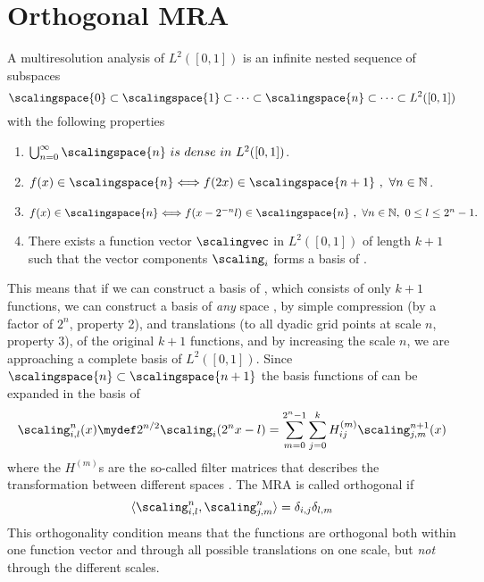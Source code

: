 \section{Orthogonal MRA}
A multiresolution analysis of $L^2([0,1])$ is an infinite nested sequence of subspaces
\begin{equation}
    \label{eq:MRA}
    \scalingspace{0}\subset \scalingspace{1}\subset \cdots \subset 
	\scalingspace{n}\subset \cdots \subset L^2([0,1])
\end{equation}
with the following properties
\begin{enumerate}
    \item $\bigcup_{n=0}^{\infty}\scalingspace{n}\ is\ dense\ in\ L^2([0,1])$.
    \item $f(x) \in \scalingspace{n} \Longleftrightarrow f(2x) \in \scalingspace{n+1}
    	\ ,\ \forall n \in \mathbb{N}$.
    \item $f(x) \in \scalingspace{n} \Longleftrightarrow f(x-2^{-n}l) \in 
	\scalingspace{n}\ ,\ \forall n \in \mathbb{N},\ 0 \leq l \leq 2^n - 1.$
    \item There exists a function vector $\scalingvec$ in $L^2([0,1])$ of length
	$k+1$ such that the vector components $\scaling_i$ forms a basis of 
	. 
\end{enumerate}
This means that if we can construct a basis of , which consists of 
only $k+1$ functions, we can construct a basis of \emph{any} space , 
by simple compression (by a factor of $2^n$, property 2), and translations (to all 
dyadic grid points at scale $n$, property 3), of the original $k+1$ functions, and 
by increasing the scale $n$, we are approaching a complete basis of $L^2([0,1])$. 
Since $\scalingspace{n} \subset \scalingspace{n+1}$ the basis functions of 
 can be expanded in the basis of 
\begin{equation}
    \label{eq:twoscalescaling}
    \scaling^n_{i,l}(x) \mydef 2^{n/2}\scaling_i(2^nx-l) = 
	\sum_{m=0}^{2^n-1} \sum_{j=0}^k H_{ij}^{(m)} \scaling^{n+1}_{j,m}(x)
\end{equation}
where the $H^{(m)}$s are the so-called filter matrices that describes the 
transformation between different spaces . The MRA is called 
orthogonal if 
\begin{equation}
    \label{eq:orthogonality}
    \langle \scaling_{i,l}^n, \scaling_{j,m}^n \rangle = \delta_{i,j}\delta_{l,m}
\end{equation}
This orthogonality condition means that the 
functions are orthogonal both within one function vector and through all 
possible translations on one scale, but \emph{not} through the different scales.

